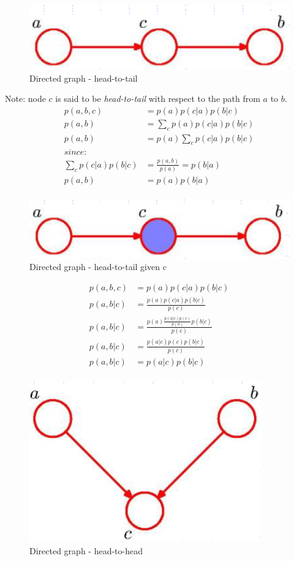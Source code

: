 \begin{figure}[H]
 \centering 
\includegraphics[scale=0.42]{images/head-to-tail.png} 
 \caption{Directed graph - head-to-tail}
 \label{fig:head-to-tail}
\end{figure}
Note: node $c$ is said to be \textit{head-to-tail} with respect to the path from $a$ to $b$.
\begin{align*}
    p(a,b,c) & = p(a)p(c|a)p(b|c) \\
    p(a,b) & = \sum_c p(a)p(c|a)p(b|c) \\
    p(a,b) & = p(a) \sum_c p(c|a)p(b|c) \\
    since:\\
    \sum_c p(c|a)p(b|c) & = \frac{p(a,b)}{p(a)} = p(b|a) \\
    p(a,b) & = p(a)p(b|a) \\
\end{align*}
\begin{figure}[H]
 \centering 
\includegraphics[scale=0.42]{images/head-to-tail-given-c.png} 
 \caption{Directed graph - head-to-tail given c}
 \label{fig:head-to-tail-given-c}
\end{figure}
\begin{align*}
    p(a,b,c) & = p(a)p(c|a)p(b|c) \\
    p(a,b|c) & = \frac{p(a)p(c|a)p(b|c)}{p(c)} \\
    p(a,b|c) & = \frac{p(a)\frac{p(a|c)p(c)}{p(a)} p(b|c)}{p(c)} \\
    p(a,b|c) & = \frac{p(a|c)p(c) p(b|c)}{p(c)} \\
    p(a,b|c) & = p(a|c)p(b|c) \\
\end{align*}
\begin{figure}[H]
 \centering 
\includegraphics[scale=0.42]{images/head-to-head.png} 
 \caption{Directed graph - head-to-head}
 \label{fig:head-to-head}
\end{figure}
